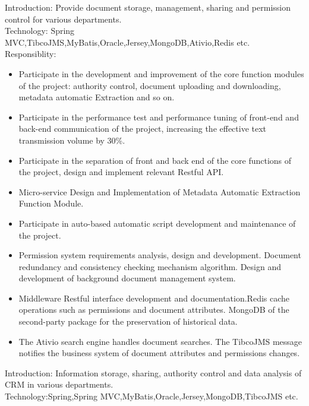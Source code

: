 \documentclass{resume}
\begin{document}
Introduction: Provide document storage, management, sharing and permission control for various departments.\\
Technology: Spring MVC,TibcoJMS,MyBatis,Oracle,Jersey,MongoDB,Ativio,Redis etc.\\
Responsiblity:
\begin{itemize}
  \item Participate in the development and improvement of the core function modules of the project: authority
control, document uploading and downloading, metadata automatic Extraction and so on.
  \item Participate in the performance test and performance tuning of front-end and back-end communication of
the project, increasing the effective text transmission volume by 30\%.
  \item Participate in the separation of front and back end of the core functions of the project, design and implement
relevant Restful API.
  \item Micro-service Design and Implementation of Metadata Automatic Extraction Function Module.
  \item  Participate in auto-based automatic script development and maintenance of the project.
  \item Permission system requirements analysis, design and development. Document redundancy and consistency checking mechanism algorithm. Design and development of background document management system.
  \item Middleware Restful interface development and documentation.Redis cache operations such as permissions and document attributes. MongoDB of the second-party package for the preservation of historical data.
  \item The Ativio search engine handles document searches. The TibcoJMS message notifies the business system of document attributes and permissions changes.
\end{itemize}
Introduction: Information storage, sharing, authority control and data analysis of CRM in various departments.\\
Technology:Spring,Spring MVC,MyBatis,Oracle,Jersey,MongoDB,TibcoJMS etc.\\
\end{document}
